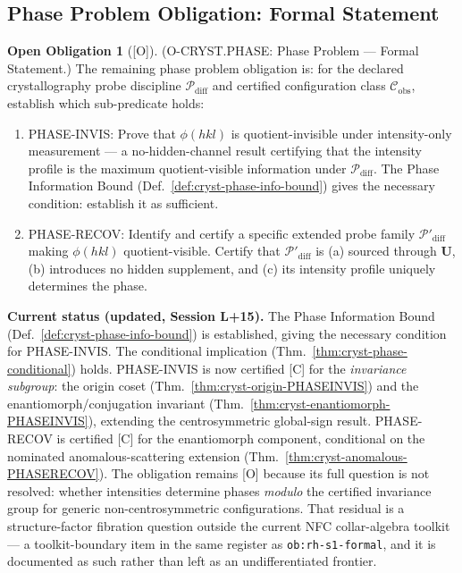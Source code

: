 \documentclass[12pt,oneside]{amsbook}
\theoremstyle{plain}
\theoremstyle{definition}
\newtheorem{obligation}[theorem]{Open Obligation}
\theoremstyle{remark}
\newcommand{\status}[1]{\textup{[#1]}}
\begin{document}
\subsection{Phase Problem Obligation: Formal Statement}

\begin{obligation}[\status{O}]\label{ob:cryst-PHASE}
\textup{(O-CRYST.PHASE: Phase Problem --- Formal Statement.)}
The remaining phase problem obligation is: for the declared
crystallography probe discipline $\mathcal{P}_{\mathrm{diff}}$
and certified configuration class $\mathcal{C}_{\mathrm{obs}}$,
establish which sub-predicate holds:

\begin{enumerate}[label=\textup{(\Alph*)}]
  \item \textup{PHASE-INVIS}: Prove that $\phi(hkl)$ is
    quotient-invisible under intensity-only measurement ---
    a no-hidden-channel result certifying that the intensity
    profile is the maximum quotient-visible information under
    $\mathcal{P}_{\mathrm{diff}}$.  The Phase Information Bound
    (Def.~\ref{def:cryst-phase-info-bound}) gives the
    necessary condition: establish it as sufficient.

  \item \textup{PHASE-RECOV}: Identify and certify a specific
    extended probe family $\mathcal{P}'_{\mathrm{diff}}$ making
    $\phi(hkl)$ quotient-visible.  Certify that
    $\mathcal{P}'_{\mathrm{diff}}$ is (a) sourced through
    $\mathbf{U}$, (b) introduces no hidden supplement, and
    (c) its intensity profile uniquely determines the phase.
\end{enumerate}

\textbf{Current status (updated, Session L+15).} The Phase
Information Bound (Def.~\ref{def:cryst-phase-info-bound}) is
established, giving the necessary condition for PHASE-INVIS.  The
conditional implication (Thm.~\ref{thm:cryst-phase-conditional})
holds.  PHASE-INVIS is now certified [C] for the
\emph{invariance subgroup}: the origin coset
(Thm.~\ref{thm:cryst-origin-PHASEINVIS}) and the
enantiomorph/conjugation invariant
(Thm.~\ref{thm:cryst-enantiomorph-PHASEINVIS}), extending the
centrosymmetric global-sign result.  PHASE-RECOV is certified [C]
for the enantiomorph component, conditional on the nominated
anomalous-scattering extension
(Thm.~\ref{thm:cryst-anomalous-PHASERECOV}).  The obligation
remains [O] because its full question is not resolved: whether
intensities determine phases \emph{modulo} the certified
invariance group for generic non-centrosymmetric configurations.
That residual is a structure-factor fibration question outside the
current NFC collar-algebra toolkit --- a toolkit-boundary item in
the same register as \texttt{ob:rh-s1-formal}, and it is
documented as such rather than left as an undifferentiated
frontier.


\end{obligation}
\end{document}
